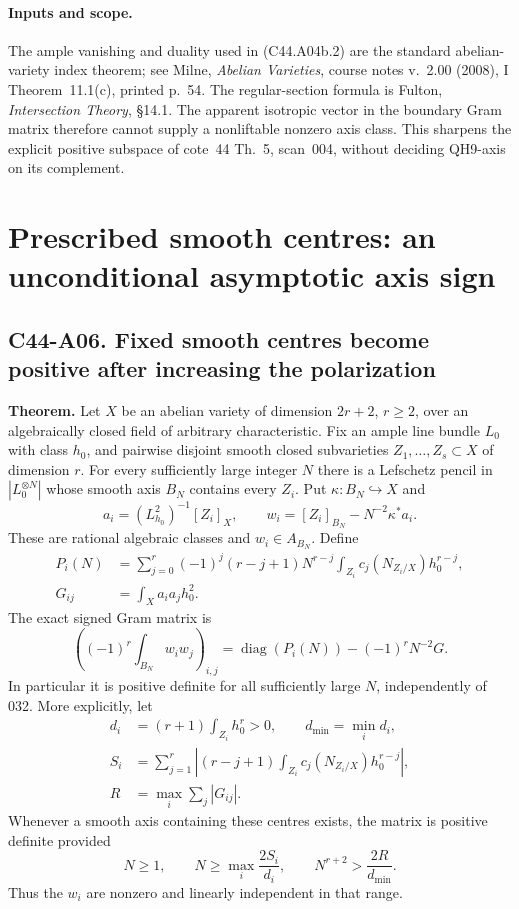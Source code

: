 \documentclass[11pt]{article}
\theoremstyle{remark}\newtheorem{remark}[theorem]{Remark}
\begin{document}
\paragraph{Inputs and scope.}
The ample vanishing and duality used in (C44.A04b.2) are the
standard abelian-variety index theorem; see Milne,
\emph{Abelian Varieties}, course notes v.~2.00 (2008),
I Theorem~11.1(c), printed p.~54. The regular-section formula is
Fulton, \emph{Intersection Theory}, \S14.1. The apparent isotropic
vector in the boundary Gram matrix therefore cannot supply a
nonliftable nonzero axis class. This sharpens the explicit
positive subspace of cote~44 Th.~5, scan~004, without deciding
QH9-axis on its complement.


\section{Prescribed smooth centres: an unconditional asymptotic axis sign}

\subsection*{C44-A06. Fixed smooth centres become positive after increasing the polarization}

\textbf{Theorem.}
Let $X$ be an abelian variety of dimension $2r+2$, $r\ge2$, over
an algebraically closed field of arbitrary characteristic. Fix an
ample line bundle $L_0$ with class $h_0$, and pairwise disjoint
smooth closed subvarieties $Z_1,\ldots,Z_s\subset X$ of dimension
$r$. For every sufficiently large integer $N$ there is a Lefschetz
pencil in $|L_0^{\otimes N}|$ whose smooth axis $B_N$ contains every
$Z_i$. Put $\kappa:B_N\hookrightarrow X$ and
\[
 a_i=(L_{h_0}^{2})^{-1}[Z_i]_X,
 \qquad w_i=[Z_i]_{B_N}-N^{-2}\kappa^*a_i.
 \tag{C44.A06.1}
\]
These are rational algebraic classes and $w_i\in A_{B_N}$. Define
\[
 \begin{split}
 P_i(N)&=\sum_{j=0}^r(-1)^j(r-j+1)N^{r-j}
       \int_{Z_i}c_j(N_{Z_i/X})h_0^{r-j},\\
 G_{ij}&=\int_X a_i a_jh_0^2.
 \end{split}
 \tag{C44.A06.2}
\]
The exact signed Gram matrix is
\[
 \left((-1)^r\int_{B_N}w_iw_j\right)_{i,j}
       =\operatorname{diag}(P_i(N))-(-1)^rN^{-2}G.
 \tag{C44.A06.3}
\]
In particular it is positive definite for all sufficiently large
$N$, independently of 032. More explicitly, let
\[
 \begin{split}
 d_i&=(r+1)\int_{Z_i}h_0^r>0,\qquad d_{\min}=\min_i d_i,\\
 S_i&=\sum_{j=1}^r\left|(r-j+1)
             \int_{Z_i}c_j(N_{Z_i/X})h_0^{r-j}\right|,\\
 R&=\max_i\sum_j|G_{ij}|.
 \end{split}
\]
Whenever a smooth axis containing these centres exists, the matrix
is positive definite provided
\[
 N\ge1,\qquad N\ge\max_i\frac{2S_i}{d_i},
 \qquad N^{r+2}>\frac{2R}{d_{\min}}.
 \tag{C44.A06.4}
\]
Thus the $w_i$ are nonzero and linearly independent in that range.
\end{document}
